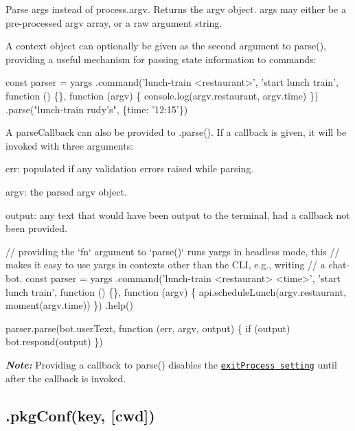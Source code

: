 Parse {\ttfamily args} instead of {\ttfamily process.\+argv}. Returns the {\ttfamily argv} object. {\ttfamily args} may either be a pre-\/processed argv array, or a raw argument string.

A {\ttfamily context} object can optionally be given as the second argument to {\ttfamily parse()}, providing a useful mechanism for passing state information to commands\+:


\begin{DoxyCode}
const parser = yargs
  .command('lunch-train <restaurant>', 'start lunch train', function () \{\}, function (argv) \{
    console.log(argv.restaurant, argv.time)
  \})
  .parse("lunch-train rudy's", \{time: '12:15'\})
\end{DoxyCode}


A {\ttfamily parse\+Callback} can also be provided to {\ttfamily .parse()}. If a callback is given, it will be invoked with three arguments\+:


\begin{DoxyEnumerate}
\item {\ttfamily err}\+: populated if any validation errors raised while parsing.
\item {\ttfamily argv}\+: the parsed argv object.
\item {\ttfamily output}\+: any text that would have been output to the terminal, had a callback not been provided.
\end{DoxyEnumerate}


\begin{DoxyCode}
// providing the `fn` argument to `parse()` runs yargs in headless mode, this
// makes it easy to use yargs in contexts other than the CLI, e.g., writing
// a chat-bot.
const parser = yargs
  .command('lunch-train <restaurant> <time>', 'start lunch train', function () \{\}, function (argv) \{
    api.scheduleLunch(argv.restaurant, moment(argv.time))
  \})
  .help()

parser.parse(bot.userText, function (err, argv, output) \{
  if (output) bot.respond(output)
\})
\end{DoxyCode}


{\itshape {\bfseries Note\+:}} Providing a callback to {\ttfamily parse()} disables the \href{#exitprocess}{\tt {\ttfamily exit\+Process} setting} until after the callback is invoked.

\subsection*{.pkg\+Conf(key, \mbox{[}cwd\mbox{]}) }

